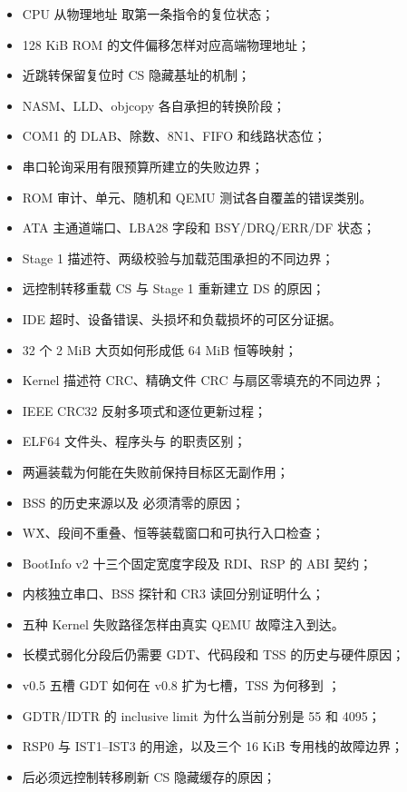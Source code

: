 \begin{itemize}
  \item CPU 从物理地址  取第一条指令的复位状态；
  \item 128 KiB ROM 的文件偏移怎样对应高端物理地址；
  \item 近跳转保留复位时 CS 隐藏基址的机制；
  \item NASM、LLD、objcopy 各自承担的转换阶段；
  \item COM1 的 DLAB、除数、8N1、FIFO 和线路状态位；
  \item 串口轮询采用有限预算所建立的失败边界；
  \item ROM 审计、单元、随机和 QEMU 测试各自覆盖的错误类别。
  \item ATA 主通道端口、LBA28 字段和 BSY/DRQ/ERR/DF 状态；
  \item Stage 1 描述符、两级校验与加载范围承担的不同边界；
  \item 远控制转移重载 CS 与 Stage 1 重新建立 DS 的原因；
  \item IDE 超时、设备错误、头损坏和负载损坏的可区分证据。
  \item 32 个 2 MiB 大页如何形成低 64 MiB 恒等映射；
  \item Kernel 描述符 CRC、精确文件 CRC 与扇区零填充的不同边界；
  \item IEEE CRC32 反射多项式和逐位更新过程；
  \item ELF64 文件头、程序头与  的职责区别；
  \item 两遍装载为何能在失败前保持目标区无副作用；
  \item BSS 的历史来源以及  必须清零的原因；
  \item W\^X、段间不重叠、恒等装载窗口和可执行入口检查；
  \item BootInfo v2 十三个固定宽度字段及 RDI、RSP 的 ABI 契约；
  \item 内核独立串口、BSS 探针和 CR3 读回分别证明什么；
  \item 五种 Kernel 失败路径怎样由真实 QEMU 故障注入到达。
  \item 长模式弱化分段后仍需要 GDT、代码段和 TSS 的历史与硬件原因；
  \item v0.5 五槽 GDT 如何在 v0.8 扩为七槽，TSS 为何移到 ；
  \item GDTR/IDTR 的 inclusive limit 为什么当前分别是 55 和 4095；
  \item RSP0 与 IST1--IST3 的用途，以及三个 16 KiB 专用栈的故障边界；
  \item {} 后必须远控制转移刷新 CS 隐藏缓存的原因；

\end{itemize}
